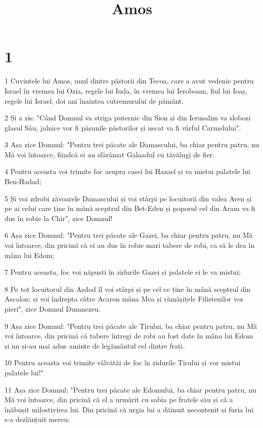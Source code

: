 

\title{Amos}


\chapter{1}

\par 1 Cuvintele lui Amos, unul dintre păstorii din Tecoa, care a avut vedenie pentru Israel în vremea lui Ozia, regele lui Iuda, în vremea lui Ieroboam, fiul lui Ioaș, regele lui Israel, doi ani înaintea cutremurului de pământ.
\par 2 Și a zis: "Când Domnul va striga puternic din Sion și din Ierusalim va slobozi glasul Său, jalnice vor fi pășunile păstorilor și uscat va fi vârful Carmelului".
\par 3 Așa zice Domnul: "Pentru trei păcate ale Damascului, ba chiar pentru patru, nu Mă voi întoarce, fiindcă ei au sfărâmat Galaadul cu tăvălugi de fier.
\par 4 Pentru aceasta voi trimite foc asupra casei lui Hazael și va mistui palatele lui Ben-Hadad;
\par 5 Și voi zdrobi zăvoarele Damascului și voi stârpi pe locuitorii din valea Aven și pe ai celui care ține în mână sceptrul din Bet-Eden și poporul cel din Aram va fi dus în robie la Chir", zice Domnul!
\par 6 Așa zice Domnul: "Pentru trei păcate ale Gazei, ba chiar pentru patru, nu Mă voi întoarce, din pricină că ei au dus în robie mari tabere de robi, ca să le dea în mâna lui Edom;
\par 7 Pentru aceasta, foc voi năpusti în zidurile Gazei și palatele ei le va mistui;
\par 8 Pe tot locuitorul din Așdod îl voi stârpi și pe cel ce ține în mână sceptrul din Ascalon; și voi îndrepta către Acaron mâna Mea și rămășițele Filistenilor vor pieri", zice Domnul Dumnezeu.
\par 9 Așa zice Domnul: "Pentru trei păcate ale Tirului, ba chiar pentru patru, nu Mă voi întoarce, din pricină că tabere întregi de robi au fost date în mâna lui Edom și nu și-au mai adus aminte de legământul cel dintre frați.
\par 10 Pentru aceasta voi trimite vâlvătăi de foc în zidurile Tirului și vor mistui palatele lui!"
\par 11 Așa zice Domnul: "Pentru trei păcate ale Edomului, ba chiar pentru patru, nu Mă voi întoarce, din pricină că el a urmărit cu sabia pe fratele său și că a înăbușit milostivirea lui. Din pricină că urgia lui a dăinuit necontenit și furia lui s-a dezlănțuit mereu;
